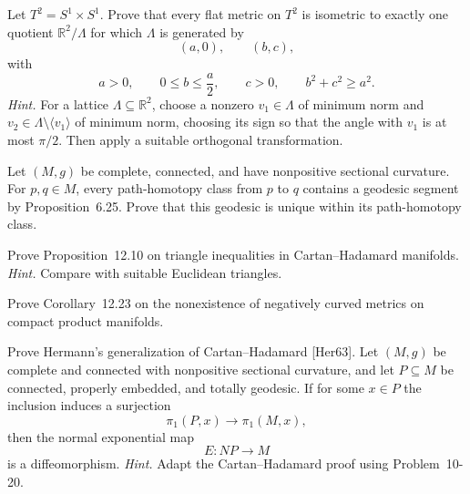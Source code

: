 \begin{exercise}
\label{prob:classification-flat-tori}

Let $T^2=S^1\times S^1$. Prove that every flat metric on $T^2$ is isometric
to exactly one quotient $\mathbb R^2/\Lambda$ for which $\Lambda$ is
generated by
\[
(a,0),\qquad(b,c),
\]
with
\[
a>0,\qquad 0\leq b\leq\frac a2,\qquad c>0,\qquad b^2+c^2\geq a^2.
\]
\emph{Hint.} For a lattice $\Lambda\subseteq\mathbb R^2$, choose a nonzero
$v_1\in\Lambda$ of minimum norm and
$v_2\in\Lambda\setminus\langle v_1\rangle$ of minimum norm, choosing its sign
so that the angle with $v_1$ is at most $\pi/2$. Then apply a suitable
orthogonal transformation.
\end{exercise}

\begin{exercise}
\label{prob:geodesic-uniqueness-nonpositive-curvature}

Let $(M,g)$ be complete, connected, and have nonpositive sectional
curvature. For $p,q\in M$, every path-homotopy class from $p$ to $q$
contains a geodesic segment by Proposition~6.25. Prove that this geodesic is
unique within its path-homotopy class.
\end{exercise}

\begin{exercise}
\label{prob:triangle-inequalities-cartan-hadamard}

Prove Proposition~12.10 on triangle inequalities in Cartan--Hadamard
manifolds. \emph{Hint.} Compare with suitable Euclidean triangles.
\end{exercise}

\begin{exercise}
\label{prob:no-negative-curvature-compact-products}

Prove Corollary~12.23 on the nonexistence of negatively curved metrics on
compact product manifolds.
\end{exercise}

\begin{exercise}
\label{prob:cartan-hadamard-generalization}

Prove Hermann's generalization of Cartan--Hadamard [Her63]. Let $(M,g)$ be
complete and connected with nonpositive sectional curvature, and let
$P\subseteq M$ be connected, properly embedded, and totally geodesic. If for
some $x\in P$ the inclusion induces a surjection
\[
\pi_1(P,x)\longrightarrow\pi_1(M,x),
\]
then the normal exponential map
\[
E:NP\longrightarrow M
\]
is a diffeomorphism.
\emph{Hint.} Adapt the Cartan--Hadamard proof using Problem~10-20.
\end{exercise}

